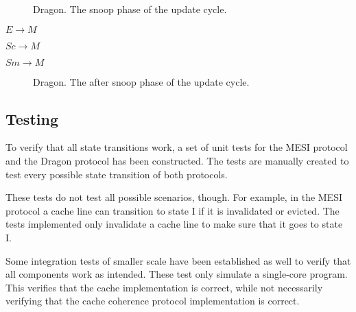 \begin{figure}[H]
    \centering
    \caption{Dragon. The snoop phase of the update cycle.}
    \label{fig:dragon_snoop}
\end{figure}

$E \to M$

$Sc \to M$

$Sm \to M$


\begin{figure}[H]
    \centering
    \caption{Dragon. The after snoop phase of the update cycle.}
    \label{fig:dragon_after_snoop}
\end{figure}





\subsection{Testing}
To verify that all state transitions work, a set of unit tests for the MESI protocol and the Dragon protocol has been constructed.
The tests are manually created to test every possible state transition of both protocols.

These tests do not test all possible scenarios, though.
For example, in the MESI protocol a cache line can transition to state I if it is invalidated or evicted.
The tests implemented only invalidate a cache line to make sure that it goes to state I.

Some integration tests of smaller scale have been established as well to verify that all components work as intended.
These test only simulate a single-core program. This verifies that the cache
implementation is correct, while not necessarily verifying that the cache coherence protocol
implementation is correct.
